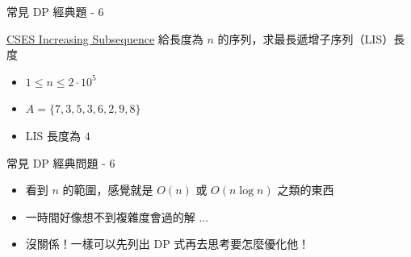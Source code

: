 \documentclass[aspectratio=169]{beamer}
\begin{document}
    \begin{frame}{常見 DP 經典題 - 6}
        \begin{block}{\href{https://cses.fi/problemset/task/1145}{CSES Increasing Subsequence}}
            給長度為 $n$ 的序列，求最長遞增子序列（LIS）長度
            \vspace{2.5mm}
            \begin{itemize}
                \item $1 \leq n \leq 2 \cdot 10^5$
            \end{itemize}
        \end{block}
        \begin{itemize}
            \item<2-> $A = \{7,3,5,3,6,2,9,8 \}$
            \item<2-> LIS 長度為 $4$
        \end{itemize}
    \end{frame}

    \begin{frame}{常見 DP 經典問題 - 6}
        \begin{itemize}
            \item 看到 $n$ 的範圍，感覺就是 $O(n)$ 或 $O(n \log n)$ 之類的東西
            \item<2-> 一時間好像想不到複雜度會過的解 ...
            \item<3-> 沒關係！一樣可以先列出 DP 式再去思考要怎麼優化他！
        \end{itemize}
    \end{frame}
\end{document}
